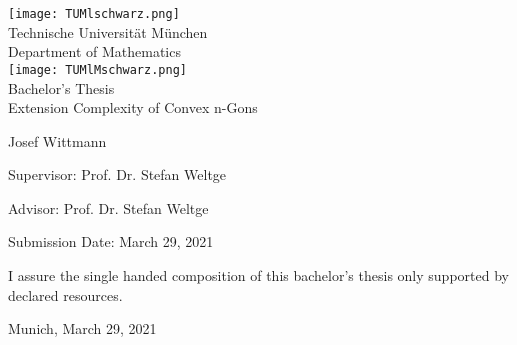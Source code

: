 \begin{titlepage}
  \begin{center}
    \texttt{[image: TUMlschwarz.png]}\\[3mm]
    \sf
    {\Large
      Technische Universität München\\[5mm]
      Department of Mathematics\\[8mm]
    }
    \normalsize
    \texttt{[image: TUMlMschwarz.png]}\\[15mm]

    Bachelor's Thesis\\[15mm]

    {\Huge
    Extension Complexity of Convex n-Gons
    }
    \bigskip

    \normalsize

    Josef Wittmann
  \end{center}
  \vspace*{75mm}

  Supervisor: Prof. Dr. Stefan Weltge
  \medskip

  Advisor: Prof. Dr. Stefan Weltge
  \medskip

  Submission Date: March 29, 2021

\end{titlepage}

\vspace*{150mm}

I assure the single handed composition of this bachelor's thesis only supported by declared resources.
\bigskip

Munich, March 29, 2021
\newpage
